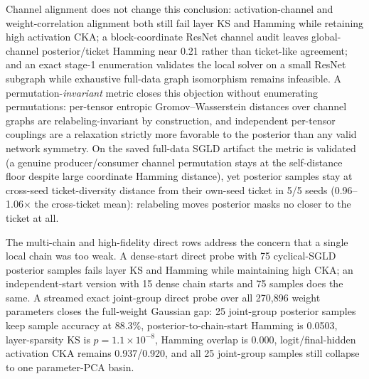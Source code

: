 \documentclass{article}
\begin{document}
Channel alignment does not change this conclusion: activation-channel and
weight-correlation alignment both still fail layer KS and Hamming while
retaining high activation CKA; a block-coordinate ResNet channel audit leaves
global-channel posterior/ticket Hamming near 0.21 rather than ticket-like
agreement; and an exact stage-1 enumeration validates the local solver on a
small ResNet subgraph while exhaustive full-data graph isomorphism remains
infeasible. A permutation-\emph{invariant} metric closes this objection
without enumerating permutations: per-tensor entropic Gromov--Wasserstein
distances over channel graphs are relabeling-invariant by construction, and
independent per-tensor couplings are a relaxation strictly more favorable
to the posterior than any valid network symmetry. On the saved full-data
SGLD artifact the metric is validated (a genuine producer/consumer channel
permutation stays at the self-distance floor despite large coordinate
Hamming distance), yet posterior samples stay at cross-seed
ticket-diversity distance from their own-seed ticket in 5/5 seeds
(0.96--1.06$\times$ the cross-ticket mean): relabeling moves posterior
masks no closer to the ticket at all.

The multi-chain and high-fidelity direct rows address the concern that a single
local chain was too weak. A dense-start direct probe with 75 cyclical-SGLD
posterior samples fails layer KS and Hamming while maintaining high CKA; an
independent-start version with 15 dense chain starts and 75 samples does the
same. A streamed exact joint-group direct probe over all 270,896 weight
parameters closes the full-weight Gaussian gap: 25 joint-group posterior
samples keep sample accuracy at 88.3\%, posterior-to-chain-start Hamming is
0.0503, layer-sparsity KS is $p=1.1{\times}10^{-8}$, Hamming overlap is 0.000,
logit/final-hidden activation CKA remains 0.937/0.920, and all 25 joint-group
samples still collapse to one parameter-PCA basin.
\end{document}
